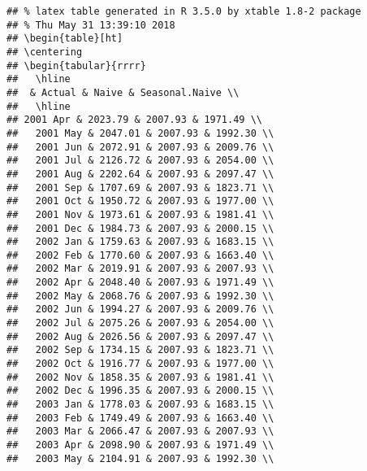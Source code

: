 \documentclass[]{article}
\begin{document}
\begin{verbatim}
## % latex table generated in R 3.5.0 by xtable 1.8-2 package
## % Thu May 31 13:39:10 2018
## \begin{table}[ht]
## \centering
## \begin{tabular}{rrrr}
##   \hline
##  & Actual & Naive & Seasonal.Naive \\ 
##   \hline
## 2001 Apr & 2023.79 & 2007.93 & 1971.49 \\ 
##   2001 May & 2047.01 & 2007.93 & 1992.30 \\ 
##   2001 Jun & 2072.91 & 2007.93 & 2009.76 \\ 
##   2001 Jul & 2126.72 & 2007.93 & 2054.00 \\ 
##   2001 Aug & 2202.64 & 2007.93 & 2097.47 \\ 
##   2001 Sep & 1707.69 & 2007.93 & 1823.71 \\ 
##   2001 Oct & 1950.72 & 2007.93 & 1977.00 \\ 
##   2001 Nov & 1973.61 & 2007.93 & 1981.41 \\ 
##   2001 Dec & 1984.73 & 2007.93 & 2000.15 \\ 
##   2002 Jan & 1759.63 & 2007.93 & 1683.15 \\ 
##   2002 Feb & 1770.60 & 2007.93 & 1663.40 \\ 
##   2002 Mar & 2019.91 & 2007.93 & 2007.93 \\ 
##   2002 Apr & 2048.40 & 2007.93 & 1971.49 \\ 
##   2002 May & 2068.76 & 2007.93 & 1992.30 \\ 
##   2002 Jun & 1994.27 & 2007.93 & 2009.76 \\ 
##   2002 Jul & 2075.26 & 2007.93 & 2054.00 \\ 
##   2002 Aug & 2026.56 & 2007.93 & 2097.47 \\ 
##   2002 Sep & 1734.15 & 2007.93 & 1823.71 \\ 
##   2002 Oct & 1916.77 & 2007.93 & 1977.00 \\ 
##   2002 Nov & 1858.35 & 2007.93 & 1981.41 \\ 
##   2002 Dec & 1996.35 & 2007.93 & 2000.15 \\ 
##   2003 Jan & 1778.03 & 2007.93 & 1683.15 \\ 
##   2003 Feb & 1749.49 & 2007.93 & 1663.40 \\ 
##   2003 Mar & 2066.47 & 2007.93 & 2007.93 \\ 
##   2003 Apr & 2098.90 & 2007.93 & 1971.49 \\ 
##   2003 May & 2104.91 & 2007.93 & 1992.30 \\ 

\end{verbatim}
\end{document}
